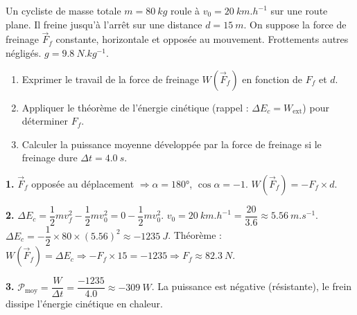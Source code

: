 \documentclass[11pt]{article}
\begin{document}
\begin{exercice}
Un cycliste de masse totale $m = \SI{80}{kg}$ roule à $v_0 = \SI{20}{km.h^{-1}}$ sur une route plane. Il freine jusqu'à l'arrêt sur une distance $d = \SI{15}{m}$. On suppose la force de freinage $\vec{F}_f$ constante, horizontale et opposée au mouvement. Frottements autres négligés. $g = \SI{9.8}{N.kg^{-1}}$.
\begin{enumerate}
\item Exprimer le travail de la force de freinage $W(\vec{F}_f)$ en fonction de $F_f$ et $d$.
\item Appliquer le théorème de l'énergie cinétique (rappel : $\Delta E_c = W_{\text{ext}}$) pour déterminer $F_f$.
\item Calculer la puissance moyenne développée par la force de freinage si le freinage dure $\Delta t = \SI{4.0}{s}$.
\end{enumerate}
\end{exercice}

\begin{corrige}
\textbf{1.} $\vec{F}_f$ opposée au déplacement $\Rightarrow \alpha = 180°$, $\cos\alpha = -1$.
$W(\vec{F}_f) = -F_f \times d$.

\textbf{2.} $\Delta E_c = \dfrac{1}{2}m v_f^2 - \dfrac{1}{2}m v_0^2 = 0 - \dfrac{1}{2}m v_0^2$.
$v_0 = \SI{20}{km.h^{-1}} = \dfrac{20}{3.6} \approx \SI{5.56}{m.s^{-1}}$.
$\Delta E_c = -\dfrac{1}{2} \times 80 \times (5.56)^2 \approx \SI{-1235}{J}$.
Théorème : $W(\vec{F}_f) = \Delta E_c \Rightarrow -F_f \times 15 = -1235 \Rightarrow F_f \approx \SI{82.3}{N}$.

\textbf{3.} $\mathcal{P}_{\text{moy}} = \dfrac{W}{\Delta t} = \dfrac{-1235}{4.0} \approx \SI{-309}{W}$.
La puissance est négative (résistante), le frein dissipe l'énergie cinétique en chaleur.
\end{corrige}
\end{document}
